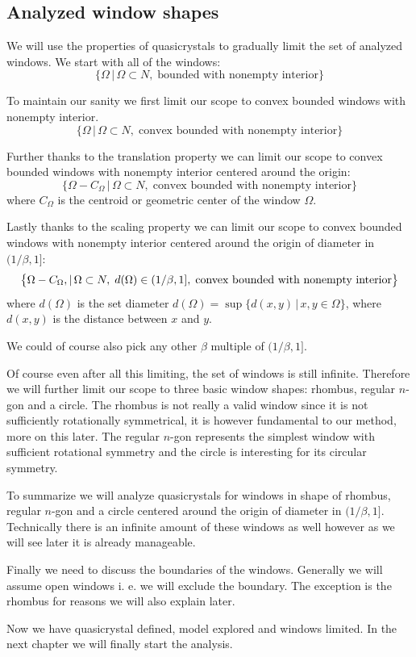 \documentclass[text.tex]{subfiles}
\begin{document}
\subsection{Analyzed window shapes}
We will use the properties of quasicrystals to gradually limit the set of analyzed windows. We start with all of the windows: 
$$\big\{\Omega\,|\, \Omega\subset N ,\;\text{bounded with nonempty interior}\big\}$$

To maintain our sanity we first limit our scope to convex bounded windows with nonempty interior. 
$$\big\{\Omega\,|\, \Omega\subset N ,\;\text{convex bounded with nonempty interior}\big\}$$

Further thanks to the translation property we can limit our scope to convex bounded windows with nonempty interior centered around the origin: 
$$\big\{\Omega-C_\Omega\,|\, \Omega\subset N ,\;\text{convex bounded with nonempty interior}\big\}$$
where $C_\Omega$ is the centroid or geometric center of the window $\Omega$. 

Lastly thanks to the scaling property we can limit our scope to convex bounded windows with nonempty interior centered around the origin of diameter in $(1/\beta,1]$:
$$\big\{\Omega-C_\Omega\\,|\, \Omega\subset N ,\; d(\Omega)\in (1/\beta,1] ,\;\text{convex bounded with nonempty interior}\big\}$$
where $d(\Omega)$ is the set diameter $d(\Omega) = \sup\{d(x,y)\,|\,x,y\in\Omega\}$, where $d(x,y)$ is the distance between $x$ and $y$. 

\begin{remark}
We could of course also pick any other $\beta$ multiple of $(1/\beta,1]$. 
\end{remark}

Of course even after all this limiting, the set of windows is still infinite. Therefore we will further limit our scope to three basic window shapes: rhombus, regular $n$-gon and a circle. The rhombus is not really a valid window since it is not sufficiently rotationally symmetrical, it is however fundamental to our method, more on this later. The regular $n$-gon represents the simplest window with sufficient rotational symmetry and the circle is interesting for its circular symmetry. 

To summarize we will analyze quasicrystals for windows in shape of rhombus, regular $n$-gon and a circle centered around the origin of diameter in $(1/\beta,1]$. Technically there is an infinite amount of these windows as well however as we will see later it is already manageable. 

Finally we need to discuss the boundaries of the windows. Generally we will assume open windows i. e. we will exclude the boundary. The exception is the rhombus for reasons we will also explain later. 

Now we have quasicrystal defined, model explored and windows limited. In the next chapter we will finally start the analysis. 
\end{document}
